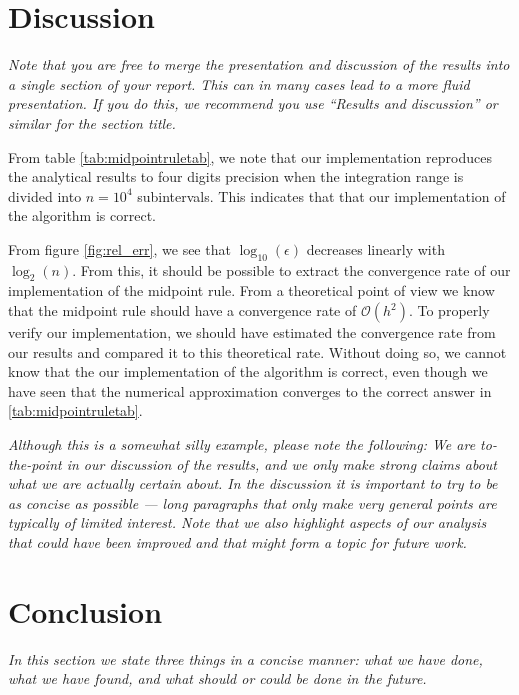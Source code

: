 \documentclass[english,notitlepage,reprint,nofootinbib]{revtex4-1}  %
\begin{document}
	
	\section{Discussion}\label{sec:discussion}
	\textit{Note that you are free to merge the presentation and discussion of the results into a single section of your report. This can in many cases lead to a more fluid presentation. If you do this, we recommend you use ``Results and discussion'' or similar for the section title.}
	
	From table \ref{tab:midpointruletab}, we note that our implementation reproduces the analytical results to four digits precision when the integration range is divided into $n = 10^4$ subintervals. This indicates that that our implementation of the algorithm is correct.
	
	From figure \ref{fig:rel_err}, we see that $\log_{10}(\epsilon)$ decreases linearly with $\log_{2}(n)$. From this, it should be possible to extract the convergence rate of our implementation of the midpoint rule. From a theoretical point of view we know that the midpoint rule should have a convergence rate of $\mathcal{O}(h^2)$. To properly verify our implementation, we should have estimated the convergence rate from our results and compared it to this theoretical rate. Without doing so, we cannot know that the our implementation of the algorithm is correct, even though we have seen that the numerical approximation converges to the correct answer in \ref{tab:midpointruletab}.
	
	\textit{Although this is a somewhat silly example, please note the following: We are to-the-point in our discussion of the results, and we only make strong claims about what we are actually certain about. In the discussion it is important to try to be as concise as possible --- long paragraphs that only make very general points are typically of limited interest. Note that we also highlight aspects of our analysis that could have been improved and that might form a topic for future work.}
	
	
	\section{Conclusion}\label{sec:conclusion}
	\textit{In this section we state three things in a concise manner: what we have done, what we have found, and what should or could be done in the future.}
	
\end{document}
